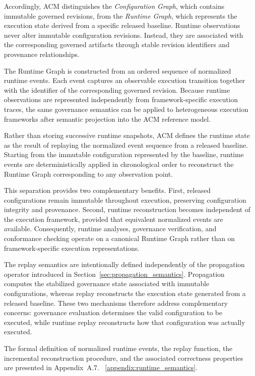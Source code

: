 \documentclass[10pt]{article}
\begin{document}
Accordingly, ACM distinguishes the \emph{Configuration Graph}, which contains
immutable governed revisions, from the \emph{Runtime Graph}, which represents
the execution state derived from a specific released baseline. Runtime
observations never alter immutable configuration revisions. Instead, they are
associated with the corresponding governed artifacts through stable revision
identifiers and provenance relationships.

The Runtime Graph is constructed from an ordered sequence of normalized runtime
events. Each event captures an observable execution transition together with the
identifier of the corresponding governed revision. Because runtime observations
are represented independently from framework-specific execution traces, the same
governance semantics can be applied to heterogeneous execution frameworks after
semantic projection into the ACM reference model.

Rather than storing successive runtime snapshots, ACM defines the runtime state
as the result of replaying the normalized event sequence from a released
baseline. Starting from the immutable configuration represented by the baseline,
runtime events are deterministically applied in chronological order to
reconstruct the Runtime Graph corresponding to any observation point.

This separation provides two complementary benefits. First, released
configurations remain immutable throughout execution, preserving configuration
integrity and provenance. Second, runtime reconstruction becomes independent of
the execution framework, provided that equivalent normalized events are
available. Consequently, runtime analyses, governance verification, and
conformance checking operate on a canonical Runtime Graph rather than on
framework-specific execution representations.

The replay semantics are intentionally defined independently of the propagation
operator introduced in Section~\ref{sec:propagation_semantics}. Propagation
computes the stabilized governance state associated with immutable
configurations, whereas replay reconstructs the execution state generated from a
released baseline. These two mechanisms therefore address complementary
concerns: governance evaluation determines the valid configuration to be
executed, while runtime replay reconstructs how that configuration was actually
executed.

The formal definition of normalized runtime events, the replay function, the
incremental reconstruction procedure, and the associated correctness properties
are presented in Appendix~A.7. ~\ref{appendix:runtime_semantics}.
\end{document}
